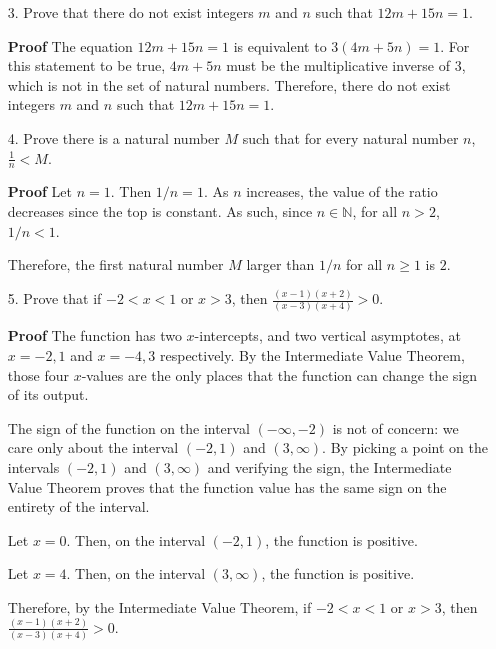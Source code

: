 \documentclass[12pt]{article}
\begin{document}
\begin{enumerate}
\item[3.] Prove that there do not exist integers $m$ and $n$ such that $12m + 15n = 1$.
\end{enumerate}

\begin{enumerate}
  \item[\textbf{Proof}] The equation $12m + 15n = 1$ is equivalent to $3(4m+5n)=1$. For this statement to be true, $4m+5n$ must be the multiplicative inverse of $3$, which is not in the set of natural numbers. Therefore, there do not exist integers $m$ and $n$ such that $12m + 15n = 1$.
\end{enumerate}

\begin{enumerate}
\item[4.] Prove there is a natural number $M$ such that for every natural number $n$, $\frac{1}{n} < M$.
\end{enumerate}

\begin{enumerate}
  \item[\textbf{Proof}] Let $n=1$. Then $1/n=1$. As $n$ increases, the value of the ratio decreases since the top is constant. As such, since $n\in\mathbb{N}$, for all $n>2$, $1/n < 1$.
  \item[] Therefore, the first natural number $M$ larger than $1/n$ for all $n\geq 1$ is $2$.
\end{enumerate}

\begin{enumerate}
\item[5.] Prove that if $-2 < x < 1$ or $x > 3$, then $\frac{(x-1)(x+2)}{(x-3)(x+4)} > 0$.
\end{enumerate}

\begin{enumerate}
  \item[\textbf{Proof}] The function has two $x$-intercepts, and two vertical asymptotes, at $x=-2,1$ and $x=-4,3$ respectively. By the Intermediate Value Theorem, those four $x$-values are the only places that the function can change the sign of its output.
  \item[] The sign of the function on the interval $(-\infty, -2)$ is not of concern: we care only about the interval $(-2,1)$ and $(3,\infty)$. By picking a point on the intervals $(-2,1)$ and $(3,\infty)$ and verifying the sign, the Intermediate Value Theorem proves that the function value has the same sign on the entirety of the interval.
  \item[] Let $x=0$. Then, on the interval $(-2,1)$, the function is positive.
  \item[] Let $x=4$. Then, on the interval $(3,\infty)$, the function is positive.
  \item[] Therefore, by the Intermediate Value Theorem, if $-2 < x < 1$ or $x > 3$, then $\frac{(x-1)(x+2)}{(x-3)(x+4)} > 0$.
\end{enumerate}
\end{document}
